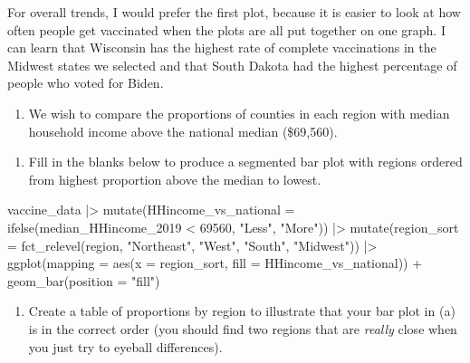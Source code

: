 \documentclass[
  letterpaper,
  DIV=11,
  numbers=noendperiod]{scrartcl}
\newenvironment{Shaded}{\begin{snugshade}}{\end{snugshade}}
\newcommand{\AttributeTok}[1]{\textcolor[rgb]{0.40,0.45,0.13}{#1}}
\newcommand{\DecValTok}[1]{\textcolor[rgb]{0.68,0.00,0.00}{#1}}
\newcommand{\FunctionTok}[1]{\textcolor[rgb]{0.28,0.35,0.67}{#1}}
\newcommand{\NormalTok}[1]{\textcolor[rgb]{0.00,0.23,0.31}{#1}}
\newcommand{\SpecialCharTok}[1]{\textcolor[rgb]{0.37,0.37,0.37}{#1}}
\newcommand{\StringTok}[1]{\textcolor[rgb]{0.13,0.47,0.30}{#1}}
\providecommand{\tightlist}{%
  \setlength{\itemsep}{0pt}\setlength{\parskip}{0pt}}
\begin{document}
For overall trends, I would prefer the first plot, because it is easier
to look at how often people get vaccinated when the plots are all put
together on one graph. I can learn that Wisconsin has the highest rate
of complete vaccinations in the Midwest states we selected and that
South Dakota had the highest percentage of people who voted for Biden.

\begin{enumerate}
\def\labelenumi{\arabic{enumi}.}
\setcounter{enumi}{1}
\tightlist
\item
  We wish to compare the proportions of counties in each region with
  median household income above the national median (\$69,560).
\end{enumerate}

\begin{enumerate}
\def\labelenumi{\alph{enumi})}
\tightlist
\item
  Fill in the blanks below to produce a segmented bar plot with regions
  ordered from highest proportion above the median to lowest.
\end{enumerate}

\begin{Shaded}
\begin{Highlighting}[]
\NormalTok{vaccine\_data }\SpecialCharTok{|\textgreater{}}
  \FunctionTok{mutate}\NormalTok{(}\AttributeTok{HHincome\_vs\_national =} \FunctionTok{ifelse}\NormalTok{(median\_HHincome\_2019 }\SpecialCharTok{\textless{}} \DecValTok{69560}\NormalTok{, }\StringTok{"Less"}\NormalTok{, }\StringTok{"More"}\NormalTok{)) }\SpecialCharTok{|\textgreater{}}
  \FunctionTok{mutate}\NormalTok{(}\AttributeTok{region\_sort =} \FunctionTok{fct\_relevel}\NormalTok{(region, }\StringTok{"Northeast"}\NormalTok{, }\StringTok{"West"}\NormalTok{, }\StringTok{"South"}\NormalTok{, }\StringTok{"Midwest"}\NormalTok{)) }\SpecialCharTok{|\textgreater{}}
  \FunctionTok{ggplot}\NormalTok{(}\AttributeTok{mapping =} \FunctionTok{aes}\NormalTok{(}\AttributeTok{x =}\NormalTok{ region\_sort, }\AttributeTok{fill =}\NormalTok{ HHincome\_vs\_national)) }\SpecialCharTok{+}
    \FunctionTok{geom\_bar}\NormalTok{(}\AttributeTok{position =} \StringTok{"fill"}\NormalTok{)}
\end{Highlighting}
\end{Shaded}

\begin{enumerate}
\def\labelenumi{\alph{enumi})}
\setcounter{enumi}{1}
\tightlist
\item
  Create a table of proportions by region to illustrate that your bar
  plot in (a) is in the correct order (you should find two regions that
  are \emph{really} close when you just try to eyeball differences).
\end{enumerate}
\end{document}
